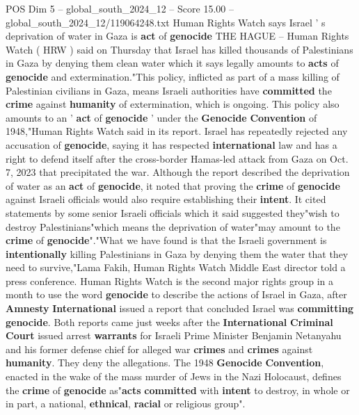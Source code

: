 \begin{textsample}{POS Dim 5 – global\_south\_2024\_12 – Score 15.00 – global\_south\_2024\_12/119064248.txt}  \label{ex:f5_pos_048}
Human Rights Watch says Israel ' s deprivation of water in Gaza is \textbf{act} of \textbf{genocide} THE HAGUE -- Human Rights Watch ( HRW ) said on Thursday that Israel has killed thousands of Palestinians in Gaza by denying them clean water which it says legally amounts to \textbf{acts} of \textbf{genocide} and extermination."This policy, inflicted as part of a mass killing of Palestinian civilians in Gaza, means Israeli authorities have \textbf{committed} the \textbf{crime} against \textbf{humanity} of extermination, which is ongoing.
This policy also amounts to an ' \textbf{act} of \textbf{genocide} ' under the \textbf{Genocide} \textbf{Convention} of 1948,"Human Rights Watch said in its report.
Israel has repeatedly rejected any accusation of \textbf{genocide}, saying it has respected \textbf{international} law and has a right to defend itself after the cross-border Hamas-led attack from Gaza on Oct. 7, 2023 that precipitated the war.
Although the report described the deprivation of water as an \textbf{act} of \textbf{genocide}, it noted that proving the \textbf{crime} of \textbf{genocide} against Israeli officials would also require establishing their \textbf{intent}.
It cited statements by some senior Israeli officials which it said suggested they"wish to destroy Palestinians"which means the deprivation of water"may amount to the \textbf{crime} of \textbf{genocide}"."What we have found is that the Israeli government is \textbf{intentionally} killing Palestinians in Gaza by denying them the water that they need to survive,"Lama Fakih, Human Rights Watch Middle East director told a press conference.
Human Rights Watch is the second major rights group in a month to use the word \textbf{genocide} to describe the actions of Israel in Gaza, after \textbf{Amnesty} \textbf{International} issued a report that concluded Israel was \textbf{committing} \textbf{genocide}.
Both reports came just weeks after the \textbf{International} \textbf{Criminal} \textbf{Court} issued arrest \textbf{warrants} for Israeli Prime Minister Benjamin Netanyahu and his former defense chief for alleged war \textbf{crimes} and \textbf{crimes} against \textbf{humanity}.
They deny the allegations.
The 1948 \textbf{Genocide} \textbf{Convention}, enacted in the wake of the mass murder of Jews in the Nazi Holocaust, defines the \textbf{crime} of \textbf{genocide} as"\textbf{acts} \textbf{committed} with \textbf{intent} to destroy, in whole or in part, a national, \textbf{ethnical}, \textbf{racial} or religious group".

\end{textsample}
